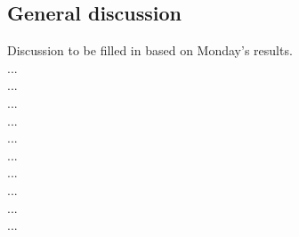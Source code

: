 \subsection{General discussion}  %

Discussion to be filled in based on Monday's results.\\...\\...\\...\\...\\...\\...\\...\\...\\...\\...

